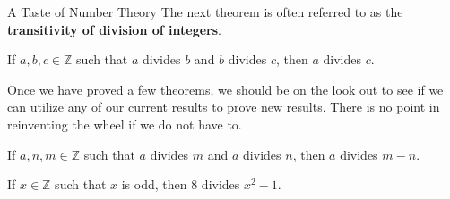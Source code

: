 \begin{section}{A Taste of Number Theory}
The next theorem is often referred to as the \textbf{transitivity of division of integers}.

\begin{theorem}\label{thm:transitivity of divides}
If $a,b,c\in\mathbb{Z}$ such that $a$ divides $b$ and $b$ divides $c$, then $a$ divides $c$.
\end{theorem}

Once we have proved a few theorems, we should be on the look out to see if we can utilize any of our current results to prove new results.  There is no point in reinventing the wheel if we do not have to.

\begin{theorem}
If $a,n,m\in\mathbb{Z}$ such that $a$ divides $m$ and $a$ divides $n$, then $a$ divides $m-n$.
\end{theorem}

\begin{theorem}
If $x\in\mathbb{Z}$ such that $x$ is odd, then 8 divides $x^{2}-1$.
\end{theorem}

\end{section}